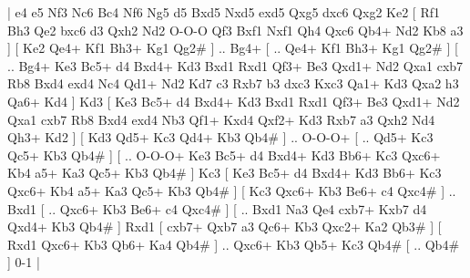 \makegametitle 
|   e4   e5    Nf3   Nc6    Bc4   Nf6    Ng5   d5    Bxd5   Nxd5    exd5   Qxg5    dxc6   Qxg2    Ke2 [  Rf1 Bh3  Qe2 bxc6  d3 Qxh2  Nd2 O-O-O  Qf3 Bxf1  Nxf1 Qh4  Qxc6 Qb4+  Nd2 Kb8  a3   ]  [  Ke2 Qe4+  Kf1 Bh3+  Kg1 Qg2#   ] .. Bg4+ [ .. Qe4+  Kf1 Bh3+  Kg1 Qg2#   ]  [ .. Bg4+  Ke3 Bc5+  d4 Bxd4+  Kd3 Bxd1  Rxd1 Qf3+  Be3 Qxd1+  Nd2 Qxa1  cxb7 Rb8  Bxd4 exd4  Nc4 Qd1+  Nd2 Kd7  c3 Rxb7  b3 dxc3  Kxc3 Qa1+  Kd3 Qxa2  h3 Qa6+  Kd4   ]  Kd3 [  Ke3 Bc5+  d4 Bxd4+  Kd3 Bxd1  Rxd1 Qf3+  Be3 Qxd1+  Nd2 Qxa1  cxb7 Rb8  Bxd4 exd4  Nb3 Qf1+  Kxd4 Qxf2+  Kd3 Rxb7  a3 Qxh2  Nd4 Qh3+  Kd2   ]  [  Kd3 Qd5+  Kc3 Qd4+  Kb3 Qb4#   ] .. O-O-O+ [ .. Qd5+  Kc3 Qc5+  Kb3 Qb4#   ]  [ .. O-O-O+  Ke3 Bc5+  d4 Bxd4+  Kd3 Bb6+  Kc3 Qxc6+  Kb4 a5+  Ka3 Qc5+  Kb3 Qb4#   ]  Kc3 [  Ke3 Bc5+  d4 Bxd4+  Kd3 Bb6+  Kc3 Qxc6+  Kb4 a5+  Ka3 Qc5+  Kb3 Qb4#   ]  [  Kc3 Qxc6+  Kb3 Be6+  c4 Qxc4#   ] .. Bxd1 [ .. Qxc6+  Kb3 Be6+  c4 Qxc4#   ]  [ .. Bxd1  Na3 Qe4  cxb7+ Kxb7  d4 Qxd4+  Kb3 Qb4#   ]  Rxd1 [  cxb7+ Qxb7  a3 Qc6+  Kb3 Qxc2+  Ka2 Qb3#   ]  [  Rxd1 Qxc6+  Kb3 Qb6+  Ka4 Qb4#   ] .. Qxc6+    Kb3  Qb5+    Kc3  Qb4#    [ .. Qb4#   ] 0-1  |
